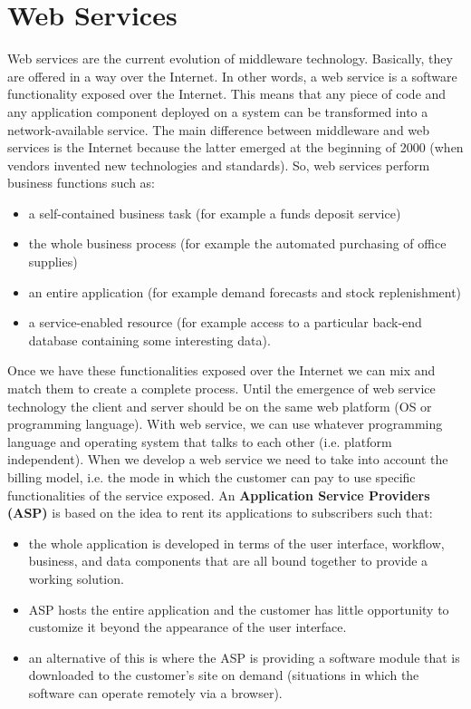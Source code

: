 \section{Web Services}
Web services are the current evolution of middleware technology.
Basically, they are offered in a way over the Internet.
In other words, a web service is a software functionality exposed over the Internet.
This means that any piece of code and any application component deployed on a system can be transformed into a network-available service.
The main difference between middleware and web services is the Internet because the latter emerged at the beginning of 2000 (when vendors invented new technologies and standards).
So, web services perform business functions such as:
\begin{itemize}
    \item a self-contained business task (for example a funds deposit service)
    \item the whole business process (for example the automated purchasing of office supplies)
    \item an entire application (for example demand forecasts and stock replenishment)
    \item a service-enabled resource (for example access to a particular back-end database containing some interesting data).
\end{itemize}
Once we have these functionalities exposed over the Internet we can mix and match them to create a complete process.
Until the emergence of web service technology the client and server should be on the same web platform (OS or programming language).
With web service, we can use whatever programming language and operating system that talks to each other (i.e. platform independent).
When we develop a web service we need to take into account the billing model, i.e. the mode in which the customer can pay to use specific functionalities of the service exposed.
An \textbf{Application Service Providers (ASP)} is based on the idea to rent its applications to subscribers such that:
\begin{itemize}
    \item the whole application is developed in terms of the user interface, workflow, business, and data components that are all bound together to provide a working solution.
    \item ASP hosts the entire application and the customer has little opportunity to customize it beyond the appearance of the user interface.
    \item an alternative of this is where the ASP is providing a software module that is downloaded to the customer's site on demand (situations in which the software can operate remotely via a browser).
\end{itemize}
